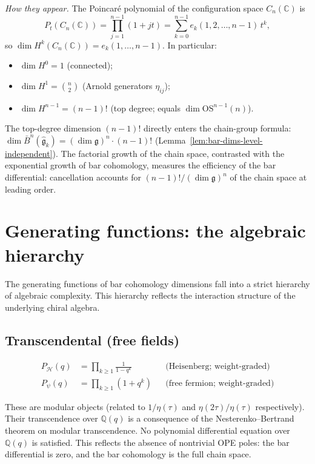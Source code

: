 \emph{How they appear.}
The Poincar\'e polynomial of the configuration space $C_n(\mathbb{C})$ is
\[
P_t(C_n(\mathbb{C})) = \prod_{j=1}^{n-1}(1+jt)
= \sum_{k=0}^{n-1} e_k(1, 2, \ldots, n-1)\, t^k,
\]
so $\dim H^k(C_n(\mathbb{C})) = e_k(1, \ldots, n-1)$. In particular:
\begin{itemize}
\item $\dim H^0 = 1$ (connected);
\item $\dim H^1 = \binom{n}{2}$ (Arnold generators $\eta_{ij}$);
\item $\dim H^{n-1} = (n-1)!$ (top degree; equals $\dim\mathrm{OS}^{n-1}(n)$).
\end{itemize}
The top-degree dimension $(n-1)!$ directly enters the chain-group formula: $\dim\bar{B}^n(\widehat{\mathfrak{g}}_k) = (\dim\mathfrak{g})^n \cdot (n-1)!$ (Lemma~\ref{lem:bar-dims-level-independent}). The factorial growth of the chain space, contrasted with the exponential growth of bar cohomology, measures the efficiency of the bar differential: cancellation accounts for $(n-1)!/(\dim\mathfrak{g})^n$ of the chain space at leading order.


\section{Generating functions: the algebraic hierarchy}
\label{sec:gf-hierarchy}

The generating functions of bar cohomology dimensions fall into a strict hierarchy of algebraic complexity. This hierarchy reflects the interaction structure of the underlying chiral algebra.

\subsection{Transcendental (free fields)}
\label{subsec:gf-transcendental}

\begin{align}
P_{\mathcal{H}}(q) &= \prod_{k \geq 1} \frac{1}{1-q^k}
&&\text{(Heisenberg; weight-graded)} \\
P_{\psi}(q) &= \prod_{k \geq 1} (1+q^k)
&&\text{(free fermion; weight-graded)}
\end{align}

These are modular objects (related to $1/\eta(\tau)$ and $\eta(2\tau)/\eta(\tau)$ respectively). Their transcendence over $\mathbb{Q}(q)$ is a consequence of the Nesterenko--Bertrand theorem on modular transcendence. No polynomial differential equation over $\mathbb{Q}(q)$ is satisfied. This reflects the absence of nontrivial OPE poles: the bar differential is zero, and the bar cohomology is the full chain space.

